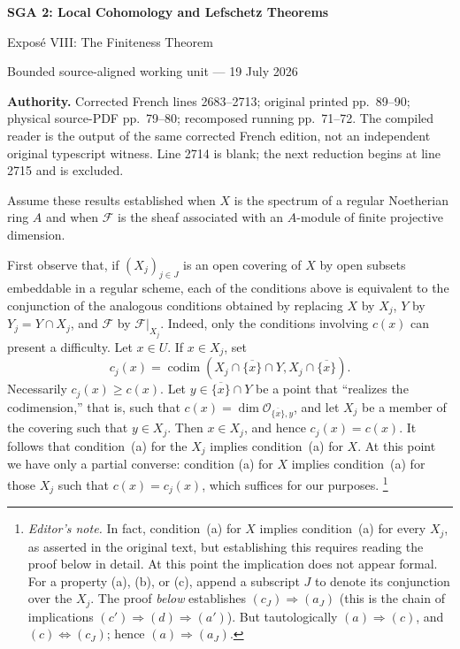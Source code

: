 \documentclass[10pt,a4paper]{article}
\newcommand{\cF}{\mathcal F}
\newcommand{\codim}{\operatorname{codim}}
\newcommand{\markedfootnote}[2]{%
  \begingroup\renewcommand{\thefootnote}{#1}\footnote{#2}\endgroup}
\begin{document}
\begin{center}
  {\Large\bfseries SGA 2: Local Cohomology and Lefschetz Theorems}\par\smallskip
  {\large Expos\'e VIII: The Finiteness Theorem}\par
  \small Bounded source-aligned working unit --- 19 July 2026
\end{center}
\noindent\colorbox{softgray}{\parbox{0.95\linewidth}{\footnotesize\textbf{Authority.}
Corrected French lines 2683--2713; original printed pp.~89--90; physical
source-PDF pp.~79--80; recomposed running pp.~71--72. The compiled reader is
the output of the same corrected French edition, not an independent original
typescript witness. Line 2714 is blank; the next reduction begins at line
2715 and is excluded.}}

\medskip
Assume these results established when $X$ is the spectrum of a regular
Noetherian ring $A$ and when $\cF$ is the sheaf associated with an $A$-module
of finite projective dimension.

First observe that, if $(X_j)_{j\in J}$ is an open covering of $X$ by open
subsets embeddable in a regular scheme, each of the conditions above is
equivalent to the conjunction of the analogous conditions obtained by
replacing $X$ by $X_j$, $Y$ by $Y_j=Y\cap X_j$, and $\cF$ by
$\cF|_{X_j}$. Indeed, only the conditions involving $c(x)$ can present a
difficulty. Let $x\in U$. If $x\in X_j$, set
\[
  c_j(x)=\codim(X_j\cap\overline{\{x\}}\cap Y,
                X_j\cap\overline{\{x\}}).
\]
Necessarily $c_j(x)\geq c(x)$. Let $y\in\overline{\{x\}}\cap Y$ be a point
that ``realizes the codimension,'' that is, such that
$c(x)=\dim\mathcal O_{\overline{\{x\}},y}$, and let $X_j$ be a member of
the covering such that $y\in X_j$. Then $x\in X_j$, and hence
$c_j(x)=c(x)$. It follows that condition~(a) for the $X_j$ implies
condition~(a) for $X$. At this point we have only a partial converse: condition
(a) for $X$ implies condition~(a) for those $X_j$ such that
$c(x)=c_j(x)$, which suffices for our purposes.%
\markedfootnote{(5)}{\textit{Editor's note.} In fact, condition~(a) for $X$
implies condition~(a) for every $X_j$, as asserted in the original text, but
establishing this requires reading the proof below in detail. At this point
the implication does not appear formal. For a property (a), (b), or (c),
append a subscript $J$ to denote its conjunction over the $X_j$. The proof
\textit{below} establishes $(c_J)\Rightarrow(a_J)$ (this is the chain of implications
$(c')\Rightarrow(d)\Rightarrow(a')$). But tautologically
$(a)\Rightarrow(c)$, and $(c)\Longleftrightarrow(c_J)$; hence
$(a)\Rightarrow(a_J)$.}
\end{document}
